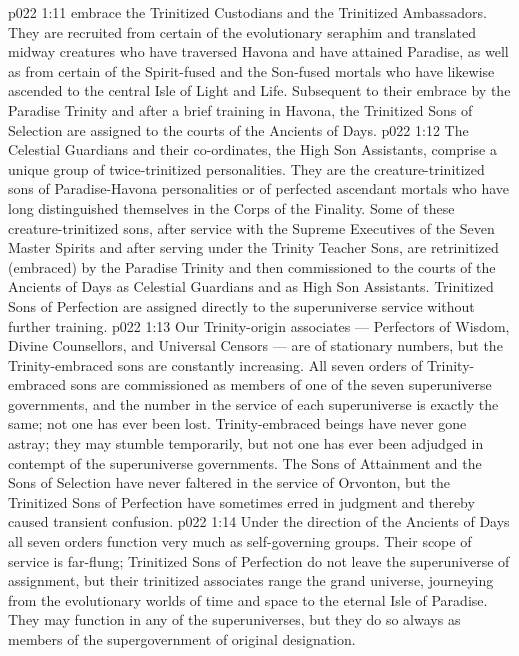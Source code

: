 \vs p022 1:11 \pc {} embrace the Trinitized Custodians and the Trinitized Ambassadors. They are recruited from certain of the evolutionary seraphim and translated midway creatures who have traversed Havona and have attained Paradise, as well as from certain of the Spirit\hyp{}fused and the Son\hyp{}fused mortals who have likewise ascended to the central Isle of Light and Life. Subsequent to their embrace by the Paradise Trinity and after a brief training in Havona, the Trinitized Sons of Selection are assigned to the courts of the Ancients of Days.
\vs p022 1:12 \pc {} The Celestial Guardians and their co\hyp{}ordinates, the High Son Assistants, comprise a unique group of twice\hyp{}trinitized personalities. They are the creature\hyp{}trinitized sons of Paradise\hyp{}Havona personalities or of perfected ascendant mortals who have long distinguished themselves in the Corps of the Finality. Some of these creature\hyp{}trinitized sons, after service with the Supreme Executives of the Seven Master Spirits and after serving under the Trinity Teacher Sons, are retrinitized (embraced) by the Paradise Trinity and then commissioned to the courts of the Ancients of Days as Celestial Guardians and as High Son Assistants. Trinitized Sons of Perfection are assigned directly to the superuniverse service without further training.
\vs p022 1:13 \pc Our Trinity\hyp{}origin associates --- Perfectors of Wisdom, Divine Counsellors, and Universal Censors --- are of stationary numbers, but the Trinity\hyp{}embraced sons are constantly increasing. All seven orders of Trinity\hyp{}embraced sons are commissioned as members of one of the seven superuniverse governments, and the number in the service of each superuniverse is exactly the same; not one has ever been lost. Trinity\hyp{}embraced beings have never gone astray; they may stumble temporarily, but not one has ever been adjudged in contempt of the superuniverse governments. The Sons of Attainment and the Sons of Selection have never faltered in the service of Orvonton, but the Trinitized Sons of Perfection have sometimes erred in judgment and thereby caused transient confusion.
\vs p022 1:14 Under the direction of the Ancients of Days all seven orders function very much as self\hyp{}governing groups. Their scope of service is far\hyp{}flung; Trinitized Sons of Perfection do not leave the superuniverse of assignment, but their trinitized associates range the grand universe, journeying from the evolutionary worlds of time and space to the eternal Isle of Paradise. They may function in any of the superuniverses, but they do so always as members of the supergovernment of original designation.
